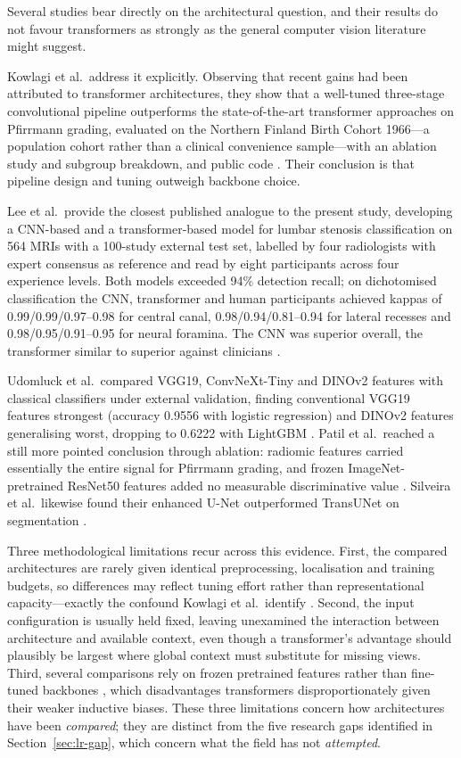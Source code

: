 Several studies bear directly on the architectural question, and their results
do not favour transformers as strongly as the general computer vision literature
might suggest.

Kowlagi et al.\ address it explicitly. Observing that recent gains had been
attributed to transformer architectures, they show that a well-tuned three-stage
convolutional pipeline outperforms the state-of-the-art transformer approaches
on Pfirrmann grading, evaluated on the Northern Finland Birth Cohort 1966---a
population cohort rather than a clinical convenience sample---with an ablation
study and subgroup breakdown, and public code \cite{kowlagi2022a}. Their
conclusion is that pipeline design and tuning outweigh backbone choice.

Lee et al.\ provide the closest published analogue to the present study,
developing a CNN-based and a transformer-based model for lumbar stenosis
classification on 564 MRIs with a 100-study external test set, labelled by four
radiologists with expert consensus as reference and read by eight participants
across four experience levels. Both models exceeded 94\% detection recall; on
dichotomised classification the CNN, transformer and human participants achieved
kappas of 0.99/0.99/0.97--0.98 for central canal, 0.98/0.94/0.81--0.94 for
lateral recesses and 0.98/0.95/0.91--0.95 for neural foramina. The CNN was
superior overall, the transformer similar to superior against clinicians
\cite{lee2026deep}.

Udomluck et al.\ compared VGG19, ConvNeXt-Tiny and DINOv2 features with classical
classifiers under external validation, finding conventional VGG19 features
strongest (accuracy 0.9556 with logistic regression) and DINOv2 features
generalising worst, dropping to 0.6222 with LightGBM
\cite{udomluck2026multitask}. Patil et al.\ reached a still more pointed
conclusion through ablation: radiomic features carried essentially the entire
signal for Pfirrmann grading, and frozen ImageNet-pretrained ResNet50 features
added no measurable discriminative value \cite{patil2026mribased}. Silveira et
al.\ likewise found their enhanced U-Net outperformed TransUNet on segmentation
\cite{silveira2025automated}.

Three methodological limitations recur across this evidence. First, the
compared architectures are rarely given identical preprocessing, localisation
and training budgets, so differences may reflect tuning effort rather than
representational capacity---exactly the confound Kowlagi et al.\ identify
\cite{kowlagi2022a}. Second, the input configuration is usually held fixed,
leaving unexamined the interaction between architecture and available context,
even though a transformer's advantage should plausibly be largest where global
context must substitute for missing views. Third, several comparisons rely on
frozen pretrained features rather than fine-tuned backbones
\cite{udomluck2026multitask,patil2026mribased}, which disadvantages transformers
disproportionately given their weaker inductive biases. These three
limitations concern how architectures have been \emph{compared}; they are
distinct from the five research gaps identified in
Section~\ref{sec:lr-gap}, which concern what the field has not
\emph{attempted}.

